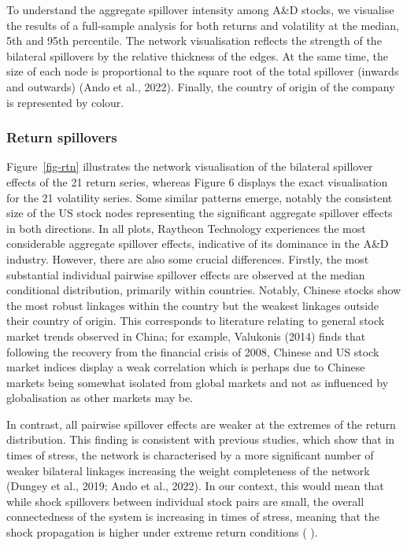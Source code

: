 \documentclass[
  letterpaper,
  DIV=11,
  numbers=noendperiod]{scrartcl}
\begin{document}
To understand the aggregate spillover intensity among A\&D stocks, we
visualise the results of a full-sample analysis for both returns and
volatility at the median, 5th and 95th percentile. The network
visualisation reflects the strength of the bilateral spillovers by the
relative thickness of the edges. At the same time, the size of each node
is proportional to the square root of the total spillover (inwards and
outwards) (Ando et al., 2022). Finally, the country of origin of the
company is represented by colour.

\hypertarget{return-spillovers}{%
\subsubsection{Return spillovers}\label{return-spillovers}}

Figure~\ref{fig-rtn} illustrates the network visualisation of the
bilateral spillover effects of the 21 return series, whereas Figure 6
displays the exact visualisation for the 21 volatility series. Some
similar patterns emerge, notably the consistent size of the US stock
nodes representing the significant aggregate spillover effects in both
directions. In all plots, Raytheon Technology experiences the most
considerable aggregate spillover effects, indicative of its dominance in
the A\&D industry. However, there are also some crucial differences.
Firstly, the most substantial individual pairwise spillover effects are
observed at the median conditional distribution, primarily within
countries. Notably, Chinese stocks show the most robust linkages within
the country but the weakest linkages outside their country of origin.
This corresponds to literature relating to general stock market trends
observed in China; for example, Valukonis (2014) finds that following
the recovery from the financial crisis of 2008, Chinese and US stock
market indices display a weak correlation which is perhaps due to
Chinese markets being somewhat isolated from global markets and not as
influenced by globalisation as other markets may be.

In contrast, all pairwise spillover effects are weaker at the extremes
of the return distribution. This finding is consistent with previous
studies, which show that in times of stress, the network is
characterised by a more significant number of weaker bilateral linkages
increasing the weight completeness of the network (Dungey et al., 2019;
Ando et al., 2022). In our context, this would mean that while shock
spillovers between individual stock pairs are small, the overall
connectedness of the system is increasing in times of stress, meaning
that the shock propagation is higher under extreme return conditions (
).
\end{document}
